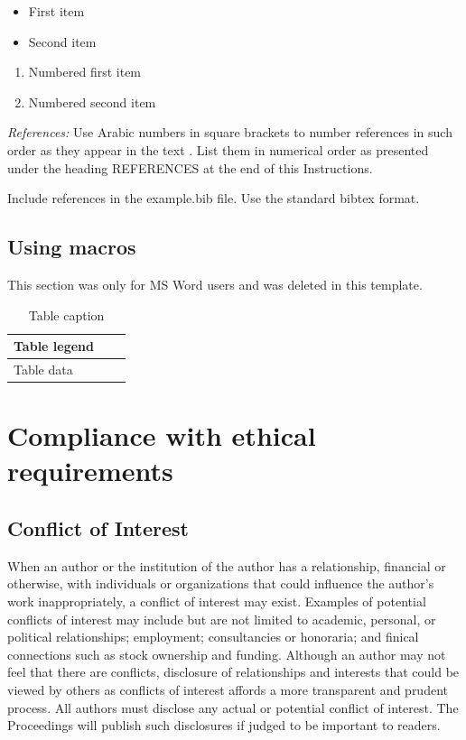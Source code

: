 \documentclass[nouppercase]{ifmbe}
\begin{document}
\begin{itemize}
\item First item
   \item Second item
\end{itemize}
\begin{enumerate}
  \item Numbered first item
  \item Numbered second item
\end{enumerate}

\textit{References:} Use Arabic numbers in square brackets to number
references in such order as they appear in the text . List them in
numerical order as presented under the heading REFERENCES at the end of
this Instructions.

Include references in the example.bib file. Use the standard bibtex
format.

\subsection{Using macros}

This section was only for MS Word users and was deleted in this template.

\begin{table}[h]
        \footnotesize  \onehalfspacing
        \caption{Table caption}
        \begin{tabular}{p{2.40cm}p{2.40cm}p{2.40cm}}
                \hline
                Table legend &  &  \\
                \hline
                Table data & &\\
                \hline
        \end{tabular}
        \label{table2}
\end{table}

\section{Compliance with ethical requirements}

\subsection{Conflict of Interest}
When an author or the institution of the author has a relationship, financial or otherwise, with individuals or organizations that could influence the author’s work inappropriately, a conflict of interest may exist. Examples of potential conflicts of interest may include but are not limited to academic, personal, or political relationships; employment; consultancies or honoraria; and finical connections such as stock ownership and funding. Although an author may not feel that there are conflicts, disclosure of relationships and interests that could be viewed by others as conflicts of interest affords a more transparent and prudent process. All authors must disclose any actual or potential conflict of interest. The Proceedings will publish such disclosures if judged to be important to readers.
\end{document}
